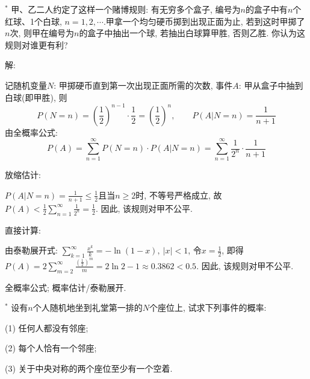 \documentclass[standard]{ExBook}
\begin{document}
\begin{qitems}
\vspace{-5em}

    \begin{bbox}
    \begin{shaded}
        \qitem$^*$
甲、乙二人约定了这样一个赌博规则: 有无穷多个盒子, 编号为$n$的盒子中有$n$个红球、1个白球, $n=1,2,\cdots$.甲拿一个均匀硬币掷到出现正面为止, 若到这时甲掷了$n$次, 则甲在编号为$n$的盒子中抽出一个球, 若抽出白球算甲胜, 否则乙胜. 你认为这规则对谁更有利?
    \end{shaded}
    \end{bbox}

\vspace{-5em}

    \begin{bbox}
解:

记随机变量$N$: 甲掷硬币直到第一次出现正面所需的次数, 事件$A$: 甲从盒子中抽到白球(即甲胜), 则
$$P(N=n)=(\frac{1}{2})^{n-1}\cdot\frac{1}{2}=(\frac{1}{2})^{n},\qquad P(A|N=n)=\frac{1}{n+1}$$
由全概率公式:
$$P(A)=\sum\limits_{n=1}^{\infty}P(N=n)\cdot P(A|N=n)=\sum\limits_{n=1}^{\infty}\frac{1}{2^n}\cdot\frac{1}{n+1}$$

 放缩估计: 

$P(A|N=n)=\frac{1}{n+1} \leq \frac{1}{2}$且当$n \geq 2$时, 不等号严格成立, 故$P(A) < \frac{1}{2}\sum\limits_{n=1}^{\infty}\frac{1}{2^n}=\frac{1}{2}$. 因此, 该规则对甲不公平.

 直接计算:

由泰勒展开式: $\sum\limits_{k=1}^{\infty}\frac{x^k}{k}=-\ln(1-x),\ |x|<1$, 令$x=\frac{1}{2}$, 即得$P(A)=2\sum\limits_{m=2}^{\infty}\frac{(\frac{1}{2})^m}{m}=2\ln2-1\approx0.3862<0.5$. 因此, 该规则对甲不公平.

\textcolor{themeColor}{\selectfont {} 全概率公式; 概率估计/泰勒展开.}
    \end{bbox}

\vspace{-5em}

    \begin{bbox}
    \begin{shaded}
        \qitem$^*$
设有$n$个人随机地坐到礼堂第一排的$N$个座位上, 试求下列事件的概率:

(1) 任何人都没有邻座;

(2) 每个人恰有一个邻座;

(3) 关于中央对称的两个座位至少有一个空着.
    \end{shaded}
    \end{bbox}


\end{qitems}
\end{document}
